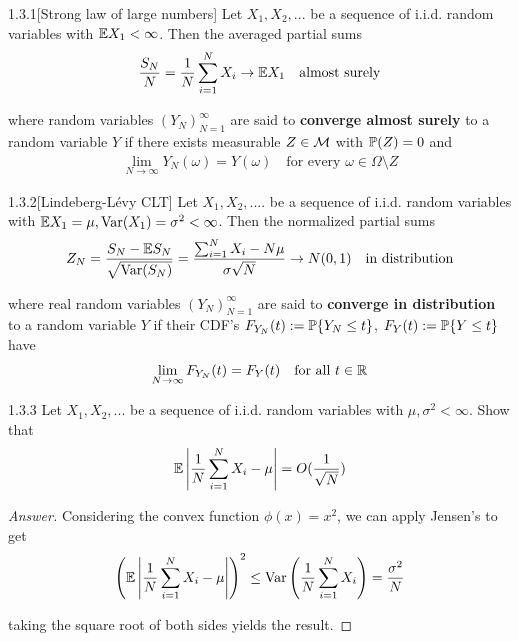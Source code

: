 \begin{thm}{1.3.1}[Strong law of large numbers]\label{1.3.1}
Let $X_1, X_2,...$ be a sequence of i.i.d. random variables with $\E X_1 < \infty$. Then the averaged partial sums
\begin{align*}
    \frac {S_N} {N} = \frac 1 N \sum_{i=1}^N X_i \to \E X_1 \quad\text{almost surely}
\end{align*}

where random variables $(Y_N)_{N=1}^\infty$ are said to \textbf{converge almost surely} to a random variable $Y$ if there exists measurable $Z \in \M$ with $\P (Z) = 0$ and
\begin{align*}
    \lim_{N\to\infty}Y_N(\omega) = Y(\omega) \quad\text{for every $\omega \in \Omega \setminus Z$}
\end{align*}
\end{thm}

\begin{thm}{1.3.2}[Lindeberg-Lévy CLT]\label{1.3.2}
Let $X_1, X_2, ....$ be a sequence of i.i.d. random variables with $\E X_1 = \mu, \Var(X_1) = \sigma^2 < \infty$. Then the normalized partial sums
\begin{align*}
Z_N =\frac {S_N - \E S_N} {\sqrt{\Var(S_N)}}= \frac{\sum_{i=1}^N X_i - N\mu}{\sigma\sqrt{N}} \to N(0,1) \quad\text{in distribution}
\end{align*}

where real random variables $(Y_N)_{N=1}^\infty$ are said to \textbf{converge in distribution} to a random variable $Y$ if their CDF's $F_{Y_N}(t) := \P \{Y_N \leq t\}$, $F_Y(t):= \P \{Y \leq t\}$ have
\begin{align*}
    \lim_{N\to\infty}F_{Y_N}(t) = F_Y(t) \quad\text{for all $t\in \R$}
\end{align*}
\end{thm}

\begin{ex}{1.3.3}\label{1.3.3} Let $X_1, X_2, ...$ be a sequence of i.i.d. random variables with $\mu, \sigma^2 < \infty$. Show that
\begin{align*}
    \E \l|\frac 1 N \sum_{i=1}^N X_i - \mu\r| = O(\frac 1 {\sqrt N})
\end{align*}
\end{ex}
\begin{proof}[Answer]
Considering the convex function $\phi(x) = x^2$, we can apply Jensen's to get
\begin{align*}
    \l(\E \l|\frac 1 N \sum_{i=1}^N X_i - \mu\r|\r)^2 \leq \Var\l(\frac 1 N \sum_{i=1}^N X_i\r) = \frac {\sigma^2} N
\end{align*}

taking the square root of both sides yields the result.
\end{proof}


